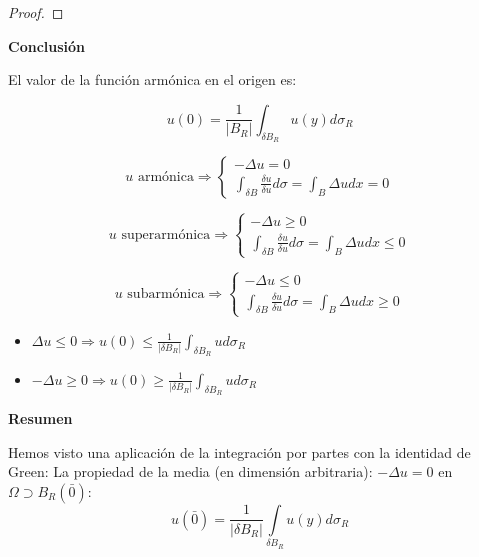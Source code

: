 \begin{itemize}
\begin{proof}
				\end{proof}

				\textbf{Conclusión}

					El valor de la función armónica en el origen es:

					\[ u(0) = \frac{1}{|B_R|} \int_{\delta B_R} u(y) d \sigma_R \]

					\obs

					\[
						u \text{ armónica} \Rightarrow \begin{cases}
							-\Delta u = 0 \\
							\int_{\delta B} \frac{\delta u}{\delta u} d \sigma = \int_{B} \Delta u dx = 0
						\end{cases}
					\]

					\[
						u \text{ superarmónica} \Rightarrow \begin{cases}
							-\Delta u \geq 0 \\
							\int_{\delta B} \frac{\delta u}{\delta u} d \sigma = \int_{B} \Delta u dx \leq 0
						\end{cases}
					\]

					\[
						u \text{ subarmónica} \Rightarrow \begin{cases}
							-\Delta u \leq 0 \\
							\int_{\delta B} \frac{\delta u}{\delta u} d \sigma = \int_{B} \Delta u dx \geq 0
						\end{cases}
					\]

		\end{itemize}

		\begin{defn}

			\begin{itemize}
				\item $\Delta u \leq 0 \Rightarrow u(0) \leq \frac{1}{|\delta B_R|} \int_{\delta B_R} u d \sigma_R $
				\item $- \Delta u \geq 0 \Rightarrow u(0) \geq \frac{1}{|\delta B_R|} \int_{\delta B_R} u d \sigma_R $
			\end{itemize}

		\end{defn}



		\textbf{Resumen}

		Hemos visto una aplicación de la integración por partes con la identidad de Green: La propiedad de la media (en dimensión arbitraria): $-\Delta u=0$ en $\Omega \supset B_R(\bar{0})$: \[u(\bar{0}) = \frac{1}{|\delta B_R|} \int\limits_{\delta B_R} u(y)d\sigma_R \]

